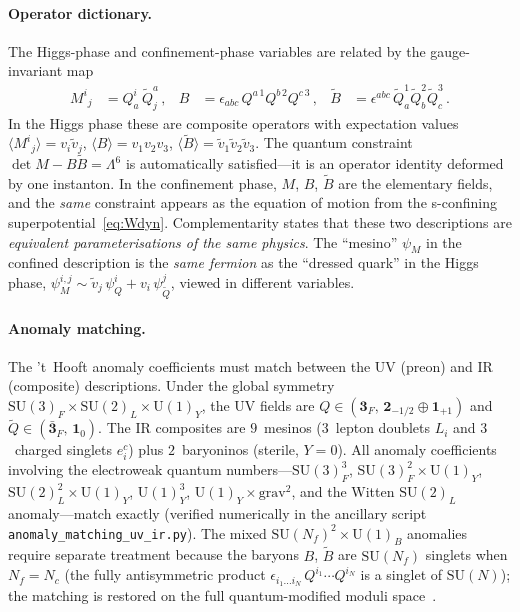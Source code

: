 \documentclass[12pt,a4paper]{article}
\newcommand{\SU}{\mathrm{SU}}
\newcommand{\UU}{\mathrm{U}}
\newcommand{\Nf}{N_f}
\newcommand{\Nc}{N_c}
\begin{document}
\paragraph{Operator dictionary.}
The Higgs-phase and confinement-phase variables are related by
the gauge-invariant map
\begin{align}
  M^i{}_j &= Q^i_a\,\tilde{Q}^a_j\,,  &
  B &= \epsilon_{abc}\,Q^{a\,1}Q^{b\,2}Q^{c\,3}\,,  &
  \tilde{B} &= \epsilon^{abc}\,\tilde{Q}_a^1\tilde{Q}_b^2
    \tilde{Q}_c^3\,.
  \label{eq:operator_map}
\end{align}
In the Higgs phase these are composite operators with expectation
values $\langle M^i{}_j\rangle = v_i\tilde{v}_j$,
$\langle B\rangle = v_1 v_2 v_3$,
$\langle\tilde{B}\rangle = \tilde{v}_1\tilde{v}_2\tilde{v}_3$.
The quantum constraint $\det M - B\tilde{B} = \Lambda^6$ is
automatically satisfied---it is an operator identity deformed by
one instanton.  In the confinement phase, $M$, $B$, $\tilde{B}$
are the elementary fields, and the \emph{same} constraint appears
as the equation of motion from the s-confining
superpotential~\eqref{eq:Wdyn}.
Complementarity states that these two descriptions are
\emph{equivalent parameterisations of the same physics}.
The ``mesino'' $\psi_M$ in the confined description is the
\emph{same fermion} as the ``dressed quark'' in the Higgs phase,
$\psi_M^{i,j} \sim \tilde{v}_j\,\psi_Q^i + v_i\,\psi_{\tilde{Q}}^j$,
viewed in different variables.

\paragraph{Anomaly matching.}
The 't~Hooft anomaly coefficients must match between the
UV (preon) and IR (composite) descriptions.  Under the global
symmetry $\SU(3)_F \times \SU(2)_L \times \UU(1)_Y$, the
UV fields are $Q \in (\mathbf{3}_F,\,\mathbf{2}_{-1/2} \oplus
\mathbf{1}_{+1})$ and $\tilde{Q} \in (\bar{\mathbf{3}}_F,\,
\mathbf{1}_0)$.  The IR composites are $9$~mesinos ($3$~lepton
doublets $L_i$ and $3$~charged singlets $e^c_i$) plus
$2$~baryoninos (sterile, $Y = 0$).  All anomaly coefficients involving the electroweak quantum
numbers---$\SU(3)_F^3$, $\SU(3)_F^2 \times \UU(1)_Y$,
$\SU(2)_L^2 \times \UU(1)_Y$, $\UU(1)_Y^3$,
$\UU(1)_Y \times \text{grav}^2$, and the Witten $\SU(2)_L$
anomaly---match exactly (verified numerically in the ancillary
script \texttt{anomaly\_matching\_uv\_ir.py}).
The mixed $\SU(N_f)^2 \times \UU(1)_B$ anomalies require
separate treatment because the baryons $B$, $\tilde{B}$ are
$\SU(N_f)$ singlets when $\Nf = \Nc$ (the fully antisymmetric
product $\epsilon_{i_1\ldots i_N}\,Q^{i_1}\cdots Q^{i_N}$ is
a singlet of $\SU(N)$); the matching is restored on the full
quantum-modified moduli
space~\cite{Intriligator:1995au}.
\end{document}
